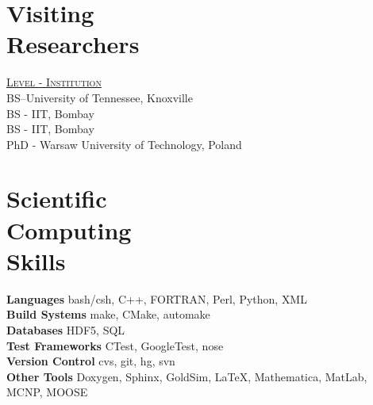 \documentclass[margin,line]{resume}
\begin{document}
\begin{resume}
    \section{\mysidestyle Visiting\\Researchers}
    \hfill\textsc{\underline{Level - Institution}}\\
    \hfill BS--University of Tennessee, Knoxville\\
    \hfill BS - IIT, Bombay \\
    \hfill BS - IIT, Bombay\\
    \hfill PhD - Warsaw University of Technology, Poland\\
    \section{\mysidestyle Scientific\\Computing\\Skills}
                \textbf{Languages} \hfill bash/csh, C++, FORTRAN, Perl, Python, XML\vspace{.5mm}\\%
                \textbf{Build Systems} \hfill make, CMake, automake\vspace{.5mm}\\%
                \textbf{Databases} \hfill HDF5, SQL\vspace{.5mm}\\%
                \textbf{Test Frameworks} \hfill CTest, GoogleTest, nose\vspace{.5mm}\\%
                \textbf{Version Control} \hfill cvs, git, hg, svn\vspace{.5mm}\\%
                \textbf{Other Tools} \hfill Doxygen, Sphinx, GoldSim, \LaTeX, Mathematica, MatLab, MCNP, MOOSE\vspace{.5mm}%



\end{resume}
\end{document}
